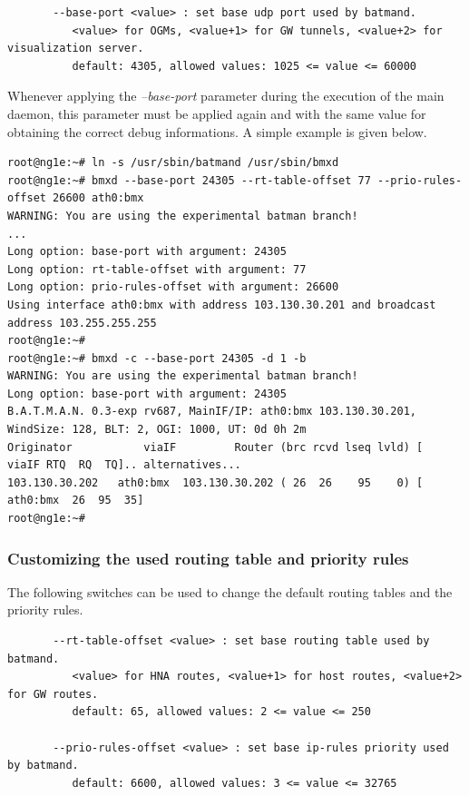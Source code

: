 \documentclass[11pt]{article}
\begin{document}
\begin{small} \begin{verbatim}
       --base-port <value> : set base udp port used by batmand.
          <value> for OGMs, <value+1> for GW tunnels, <value+2> for visualization server.
          default: 4305, allowed values: 1025 <= value <= 60000
\end{verbatim} \end{small}

Whenever applying the \emph{--base-port} parameter during the execution of the main daemon, this parameter must be applied again and with the same value for obtaining the correct debug informations. A simple example is given below.

\begin{small} \begin{verbatim}
root@ng1e:~# ln -s /usr/sbin/batmand /usr/sbin/bmxd
root@ng1e:~# bmxd --base-port 24305 --rt-table-offset 77 --prio-rules-offset 26600 ath0:bmx
WARNING: You are using the experimental batman branch!
...
Long option: base-port with argument: 24305
Long option: rt-table-offset with argument: 77
Long option: prio-rules-offset with argument: 26600
Using interface ath0:bmx with address 103.130.30.201 and broadcast address 103.255.255.255
root@ng1e:~#
root@ng1e:~# bmxd -c --base-port 24305 -d 1 -b
WARNING: You are using the experimental batman branch!
Long option: base-port with argument: 24305
B.A.T.M.A.N. 0.3-exp rv687, MainIF/IP: ath0:bmx 103.130.30.201, WindSize: 128, BLT: 2, OGI: 1000, UT: 0d 0h 2m
Originator           viaIF         Router (brc rcvd lseq lvld) [    viaIF RTQ  RQ  TQ].. alternatives...
103.130.30.202   ath0:bmx  103.130.30.202 ( 26  26    95    0) [ ath0:bmx  26  95  35]
root@ng1e:~#

\end{verbatim} \end{small}

\subsubsection{Customizing the used routing table and priority rules}

The following switches can be used to change the default routing tables and the priority rules. 

\begin{small} \begin{verbatim}
       --rt-table-offset <value> : set base routing table used by batmand.
          <value> for HNA routes, <value+1> for host routes, <value+2> for GW routes.
          default: 65, allowed values: 2 <= value <= 250

       --prio-rules-offset <value> : set base ip-rules priority used by batmand.
          default: 6600, allowed values: 3 <= value <= 32765
\end{verbatim} \end{small}
\end{document}
